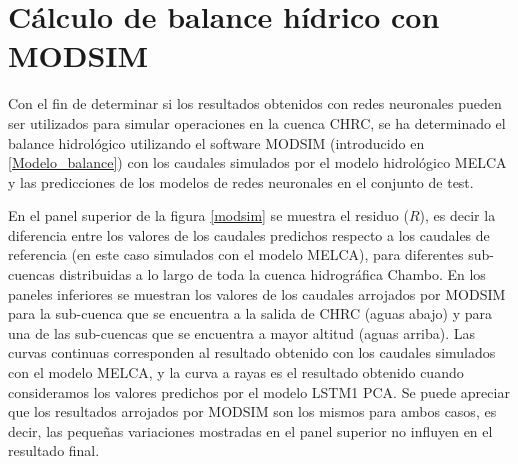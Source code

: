 \section{Cálculo de balance hídrico con MODSIM}


Con el fin de determinar si los resultados obtenidos con redes neuronales pueden ser utilizados para simular 
operaciones en la cuenca CHRC, se ha determinado el balance hidrológico utilizando el software MODSIM (introducido en \ref{Modelo_balance})
con los caudales simulados por el modelo hidrológico MELCA y las predicciones de los modelos
de redes neuronales en el conjunto de test.

En el panel superior de la figura \ref{modsim}  se muestra el residuo ($R$), es decir la diferencia entre los valores de los 
caudales predichos respecto a los caudales de referencia (en este caso simulados con el modelo MELCA), 
para diferentes sub-cuencas distribuidas a lo largo de toda la cuenca hidrográfica Chambo. 
En los paneles inferiores se muestran los valores de los caudales  arrojados por MODSIM  para la sub-cuenca que se encuentra
a la salida de CHRC (aguas abajo) y para una de las sub-cuencas que se encuentra a mayor altitud (aguas arriba). 
Las curvas continuas corresponden al resultado obtenido con los caudales simulados con el modelo MELCA, 
y la curva a rayas es el resultado obtenido cuando consideramos los valores predichos por el modelo LSTM1 PCA. 
Se puede apreciar que los resultados arrojados por MODSIM son los mismos para ambos casos, es decir, 
las pequeñas variaciones mostradas en el panel superior no influyen en el resultado final. 



